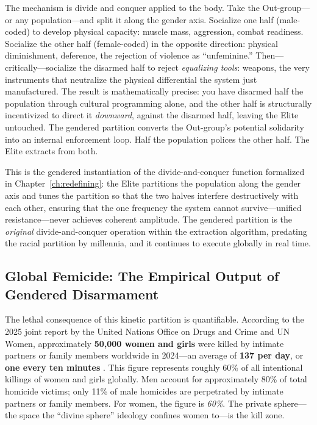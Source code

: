 The mechanism is divide and conquer applied to the body. Take the Out-group---or any population---and split it along the gender axis. Socialize one half (male-coded) to develop physical capacity: muscle mass, aggression, combat readiness. Socialize the other half (female-coded) in the opposite direction: physical diminishment, deference, the rejection of violence as ``unfeminine.'' Then---critically---socialize the disarmed half to reject \textit{equalizing tools}: weapons, the very instruments that neutralize the physical differential the system just manufactured. The result is mathematically precise: you have disarmed half the population through cultural programming alone, and the other half is structurally incentivized to direct it \textit{downward}, against the disarmed half, leaving the Elite untouched. The gendered partition converts the Out-group's potential solidarity into an internal enforcement loop. Half the population polices the other half. The Elite extracts from both.

This is the gendered instantiation of the divide-and-conquer function formalized in Chapter~\ref{ch:redefining}: the Elite partitions the population along the gender axis and tunes the partition so that the two halves interfere destructively with each other, ensuring that the one frequency the system cannot survive---unified resistance---never achieves coherent amplitude. The gendered partition is the \textit{original} divide-and-conquer operation within the extraction algorithm, predating the racial partition by millennia, and it continues to execute globally in real time.

\subsection{Global Femicide: The Empirical Output of Gendered Disarmament}

The lethal consequence of this kinetic partition is quantifiable. According to the 2025 joint report by the United Nations Office on Drugs and Crime and UN Women, approximately \textbf{50,000 women and girls} were killed by intimate partners or family members worldwide in 2024---an average of \textbf{137 per day}, or \textbf{one every ten minutes} \cite{unodc_femicide}. This figure represents roughly 60\% of all intentional killings of women and girls globally. Men account for approximately 80\% of total homicide victims; only 11\% of male homicides are perpetrated by intimate partners or family members. For women, the figure is \textit{60\%}. The private sphere---the space the ``divine sphere'' ideology confines women to---is the kill zone.

